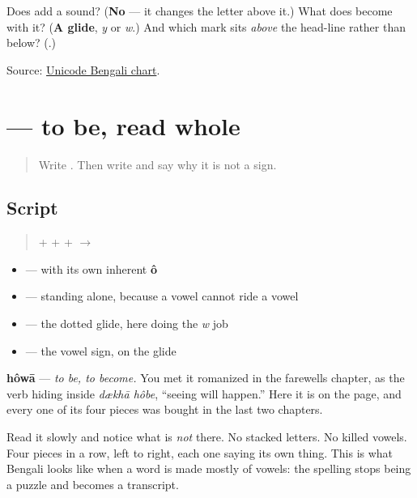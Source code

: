 \begin{tcolorbox}[breakable,colback=teal!4,colframe=teal!35!black,title={Before you move on}]
Does \textbf{} add a sound? (\textbf{No} — it changes the letter above it.) What does \textbf{} become with it? (\textbf{A glide}, \emph{y} or \emph{w}.) And which mark sits \emph{above} the head-line rather than below? (\textbf{}.)

Source: \href{https://www.unicode.org/charts/PDF/U0980.pdf}{Unicode Bengali chart}.
\end{tcolorbox}
\section[\texorpdfstring{\bn{হওয়া} (hôwā)}{হওয়া (hôwā)}]{ — to be, read whole}

\label{lesson:BN-W04-howa-read}



\begin{quote}
Write \textbf{}. Then write \textbf{} and say why it is not a sign.
\end{quote}

\subsection*{Script}
\begin{quote}
\textbf{} + \textbf{} + \textbf{} + \textbf{} $\to$ \textbf{}
\end{quote}

\begin{itemize}
\raggedright
  \item \textbf{} — with its own inherent \textbf{ô}
  \item \textbf{} — standing alone, because a vowel cannot ride a vowel
  \item \textbf{} — the dotted glide, here doing the \emph{w} job
  \item \textbf{} — the vowel sign, on the glide
\end{itemize}

\textbf{hôwā} — \emph{to be, to become.} You met it romanized in the farewells chapter, as the verb hiding inside \emph{dækhā hôbe}, \textquotedblleft{}seeing will happen.\textquotedblright{} Here it is on the page, and every one of its four pieces was bought in the last two chapters.

Read it slowly and notice what is \emph{not} there. No stacked letters. No killed vowels. Four pieces in a row, left to right, each one saying its own thing. This is what Bengali looks like when a word is made mostly of vowels: the spelling stops being a puzzle and becomes a transcript.

